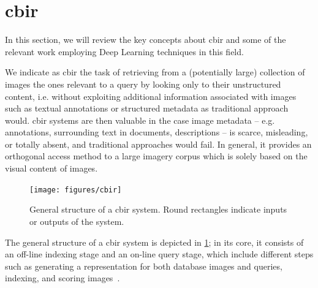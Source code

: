


\section{\acrlong{cbir}}
\label{sec:back:image-retrieval}
In this section, we will review the key concepts about \acrlong{cbir} and some of the relevant work employing Deep Learning techniques in this field.

We indicate as \acrfull{cbir} the task of retrieving from a (potentially large) collection of images the ones relevant to a query by looking only to their unstructured content, i.e. without exploiting additional information associated with images such as textual annotations or structured metadata as traditional approach would.
\gls{cbir} systems are then valuable in the case image metadata -- e.g. annotations, surrounding text in documents, descriptions -- is scarce, misleading, or totally absent, and traditional approaches would fail.
In general, it provides an orthogonal access method to a large imagery corpus which is solely based on the visual content of images.

\begin{figure}
    \texttt{[image: figures/cbir]}
    \caption{General structure of a \acrfull{cbir} system. Round rectangles indicate inputs or outputs of the system.}
    \label{fig:back:cbir}
\end{figure}
The general structure of a \gls{cbir} system is depicted in \ref{fig:back:cbir};
in its core, it consists of an off-line indexing stage and an on-line query stage, which include different steps such as generating a representation for both database images and queries, indexing, and scoring images~\cite{zhou2017recent}.

